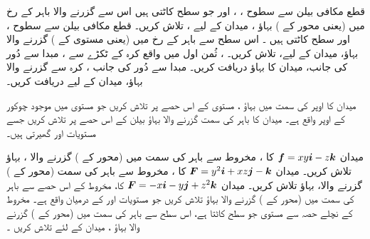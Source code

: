 \quad
قطع مکافی بیلن  سے  سطوح ، ، اور   جو سطح کاٹتی ہیں اس سے  گزرنے والا باہر  کے رخ  میں (یعنی محور   کے ) بہاؤ  ، میدان  کے لیے ، تلاش کریں۔
\quad
قطع مکافی بیلن  سے  سطوح ، اور    سطح کاٹتی ہیں ۔ اس سطح   سے   باہر  کے رخ      میں (یعنی  مستوی    کے )    گزرنے والا بہاؤ،  میدان  کے لیے،  تلاش کریں۔
\quad
  ، ثُمن اول میں واقع     کرہ   کے     ٹکڑے سے  ، مبدا سے دُور کی جانب، میدان  کا بہاؤ        دریافت کریں۔
\quad
مبدا سے دُور کی جانب  ،     کرہ    سے    گزرنے والا بہاؤ، میدان   کے لیے  دریافت کریں۔

\quad
میدان   کا اوپر کی سمت  میں بہاؤ  ، مستوی     کے اس حصے پر تلاش کریں جو مستوی  میں موجود چوکور   کے اوپر  واقع ہے۔
\quad
میدان    کا باہر کی سمت گزرنے والا بہاؤ   بیلن   کے  اس حصے پر  تلاش کریں جسے مستویات  اور  گھیرتی ہیں۔

\quad
میدان ${{\boldsymbol{f}}}= xy {\boldsymbol{i}} - z {\boldsymbol{k}}$ کا ، مخروط   سے  باہر کی سمت  میں (محور     کے )    گزرنے والا ،  بہاؤ     تلاش کریں۔
\quad
میدان ${{\boldsymbol{F}}} = y^2 {\boldsymbol{i}} + xz {\boldsymbol{j}} - {\boldsymbol{k}}$ کا  ، مخروط  سے باہر کی سمت (محور    کے )   گزرنے والا، بہاؤ       تلاش کریں۔
\quad
میدان ${{\boldsymbol{F}}} = -x {\boldsymbol{i}} - y {\boldsymbol{j}} + z^2 {\boldsymbol{k}}$ کا،   مخروط  کے اس حصے  سے باہر کی سمت  میں (محور    کے )   گزرنے والا بہاؤ       تلاش کریں جو مستویات  اور  کے درمیان واقع ہے۔
\quad
مخروط  کے نچلے حصہ سے   مستوی     جو سطح کاٹتا ہے، اس سطح  سے باہر کی سمت  میں (محور    کے )   گزرنے والا بہاؤ ، میدان   کے لئے        تلاش کریں ۔


